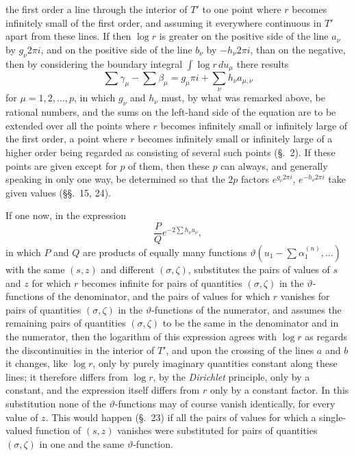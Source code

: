 \documentclass{article}
\begin{document}
the first order a line through the interior of $T'$ to one point where $r$ becomes infinitely small of the first order, and assuming it everywhere continuous in $T'$ apart from these lines. If then $\log r$ is greater on the positive side of the line $a_{\nu}$ by $g_{\nu} 2\pi i$, and on the positive side of the line $b_{\nu}$ by $-h_{\nu} 2\pi i$, than on the negative, then by considering the boundary integral $\displaystyle\int \log r\, du_{\mu}$ there results
\[ \sum \gamma_{\mu} - \sum \beta_{\mu} = g_{\mu}\pi i + \sum_{\nu} h_{\nu} a_{\mu,\nu} \]
for $\mu = 1, 2, \ldots, p$, in which $g_{\nu}$ and $h_{\nu}$ must, by what was remarked above, be rational numbers, and the sums on the left-hand side of the equation are to be extended over all the points where $r$ becomes infinitely small or infinitely large of the first order, a point where $r$ becomes infinitely small or infinitely large of a higher order being regarded as consisting of several such points (§.~2). If these points are given except for $p$ of them, then these $p$ can always, and generally speaking in only one way, be determined so that the $2p$ factors $e^{g_{\nu} 2\pi i}$, $e^{-h_{\nu} 2\pi i}$ take given values (§§.~15, 24).

If one now, in the expression
\[ \frac{P}{Q} e^{-2 \sum h_{\nu} u_{\nu}}, \]
in which $P$ and $Q$ are products of equally many functions $\vartheta\left(u_{1} - \displaystyle\sum \alpha_{1}^{(n)}, \ldots\right)$ with the same $(s, z)$ and different $(\sigma, \zeta)$, substitutes the pairs of values of $s$ and $z$ for which $r$ becomes infinite for pairs of quantities $(\sigma, \zeta)$ in the $\vartheta$-functions of the denominator, and the pairs of values for which $r$ vanishes for pairs of quantities $(\sigma, \zeta)$ in the $\vartheta$-functions of the numerator, and assumes the remaining pairs of quantities $(\sigma, \zeta)$ to be the same in the denominator and in the numerator, then the logarithm of this expression agrees with $\log r$ as regards the discontinuities in the interior of $T'$, and upon the crossing of the lines $a$ and $b$ it changes, like $\log r$, only by purely imaginary quantities constant along these lines; it therefore differs from $\log r$, by the \emph{Dirichlet} principle, only by a constant, and the expression itself differs from $r$ only by a constant factor. In this substitution none of the $\vartheta$-functions may of course vanish identically, for every value of $z$. This would happen (§.~23) if all the pairs of values for which a single-valued function of $(s, z)$ vanishes were substituted for pairs of quantities $(\sigma, \zeta)$ in one and the same $\vartheta$-function.
\end{document}
